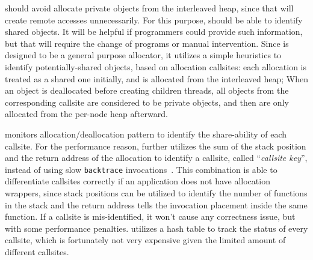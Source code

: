 \NA{} should avoid allocate private objects from the interleaved heap, since that will create remote accesses unnecessarily. For this purpose, \NM{} should be able to identify shared objects. It will be helpful if programmers could provide such information, but that will require the change of programs or manual intervention. Since \NM{} is designed to be a general purpose allocator, it utilizes a simple heuristics to identify potentially-shared objects, based on allocation callsites: each allocation is treated as a shared one initially, and is allocated from the interleaved heap; When an object is deallocated before creating children threads, all objects from the corresponding callsite are considered to be private objects, and then are only allocated from the per-node heap afterward. 

 \NM{} monitors allocation/deallocation pattern to identify the share-ability of each callsite. For the performance reason, \NA{} further utilizes the sum of the stack position and the return address of the allocation to identify a callsite, called ``\textit{callsite key}'', instead of using slow \texttt{backtrace} invocations~\cite{DBLP:conf/icse/SumnerZWZ10, DBLP:conf/cgo/ZengR0AJ014}. This combination is able to differentiate callsites correctly if an application does not have allocation wrappers, since stack positions can be utilized to identify the number of functions in the stack and the return address tells the invocation placement inside the same function. If a callsite is mis-identified, it won't cause any correctness issue, but with some performance penalties. \NA{} utilizes a hash table to track the status of every callsite, which is fortunately not very expensive given the limited amount of different callsites. 
 
